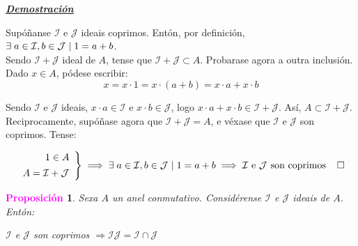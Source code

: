 \documentclass[twoside]{report}
\newcommand{\magbf}[1]{\textcolor{magenta}{\textbf{#1}}} %
\theoremstyle{mystyle}
\newtheorem{prop}{\magbf{Proposición}}[chapter]
\newenvironment{proposition}
{\begin{mdframed}[linecolor = magenta,backgroundcolor = classicrose, linewidth = 2mm]\begin{prop}}
{\end{prop}\end{mdframed}}
\begin{document}
\noindent \textbf{\textit{\underline{Demostración}}}

\vspace{2mm}

\noindent {} Supóñanse $\mathcal{I}$ e $\mathcal{J}$ ideais coprimos. Entón, por definición, $\exists \hspace{1mm} a \in \mathcal{I}, b \in \mathcal{J} \hspace{1mm} | \hspace{1mm} 1 = a + b$.\\

\noindent Sendo $\mathcal{I + J}$ ideal de $A$, tense que $\mathcal{I + J} \subset A$. Probarase agora a outra inclusión.\\

\noindent Dado $x \in A$, pódese escribir: 
$$x = x \cdot 1 = x \cdot (a + b) = x \cdot a + x \cdot b$$

\noindent Sendo $\mathcal{I}$ e $\mathcal{J}$ ideais, $x \cdot a \in \mathcal{I}$ e $x \cdot b \in \mathcal{J}$, logo $x \cdot a + x \cdot b \in \mathcal{I + J}$. Así, $A \subset \mathcal{I + J}$.\\

\noindent {} Reciprocamente, supóñase agora que $\mathcal{I + J} = A$, e véxase que $\mathcal{I}$ e $\mathcal{J}$ son coprimos. Tense:

    \[ 
    \left. \begin{array}{r} 
    1 \in A \\[1ex]
    A = \mathcal{I + J}
    \end{array} \right\}
    \implies \exists \hspace{1mm} a \in \mathcal{I}, b \in \mathcal{J} \hspace{1mm} | \hspace{1mm} 1 = a + b \implies \mathcal{I} \text{ e } \mathcal{J} \text{ son coprimos} \hspace{4mm} \square
    \]
    
\vspace{3mm}

\begin{proposition} \label{prop2.6}
Sexa $A$ un anel conmutativo. Considérense $\mathcal{I}$ e $\mathcal{J}$ ideais de $A$. Entón:
\begin{center}
    $\mathcal{I}$ e $\mathcal{J}$ son coprimos $\Longrightarrow \mathcal{IJ} = \mathcal{I \cap J}$  
\end{center}
\end{proposition}
\end{document}
